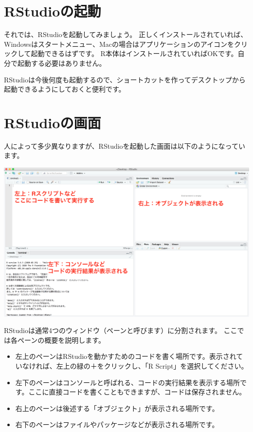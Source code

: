 \documentclass[
]{book}
\providecommand{\tightlist}{%
  \setlength{\itemsep}{0pt}\setlength{\parskip}{0pt}}
\begin{document}
\hypertarget{rstudioux306eux8d77ux52d5}{%
\section{RStudioの起動}\label{rstudioux306eux8d77ux52d5}}

それでは、RStudioを起動してみましょう。
正しくインストールされていれば、Windowsはスタートメニュー、Macの場合はアプリケーションのアイコンをクリックして起動できるはずです。
R本体はインストールされていればOKです。自分で起動する必要はありません。

RStudioは今後何度も起動するので、ショートカットを作ってデスクトップから起動できるようにしておくと便利です。

\hypertarget{rstudioux306eux753bux9762}{%
\section{RStudioの画面}\label{rstudioux306eux753bux9762}}

人によって多少異なりますが、RStudioを起動した画面は以下のようになっています。

\begin{center}\includegraphics[width=0.7\linewidth]{image/RStudio_screen} \end{center}

RStudioは通常4つのウィンドウ（ペーンと呼びます）に分割されます。
ここでは各ペーンの概要を説明します。

\begin{itemize}
\tightlist
\item
  左上のペーンはRStudioを動かすためのコードを書く場所です。表示されていなければ、左上の緑の＋をクリックし、「R Script」を選択してください。
\item
  左下のペーンはコンソールと呼ばれる、コードの実行結果を表示する場所です。ここに直接コードを書くこともできますが、コードは保存されません。
\item
  右上のペーンは後述する「オブジェクト」が表示される場所です。
\item
  右下のペーンはファイルやパッケージなどが表示される場所です。
\end{itemize}
\end{document}
